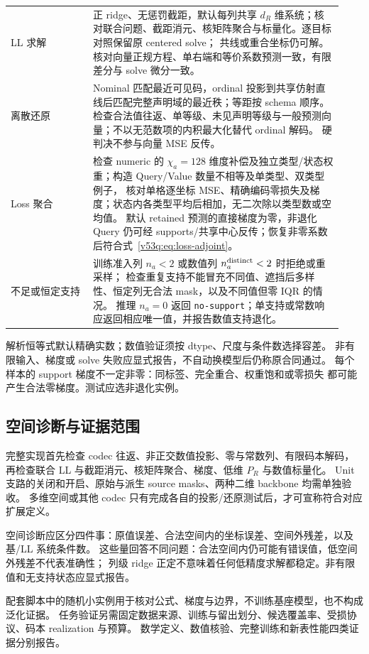 \documentclass[11pt,UTF8,fontset=fandol]{ctexart}
\numberwithin{equation}{section}
\theoremstyle{definition}
\begin{document}
\begin{longtable}{>{\raggedright\arraybackslash}p{0.23\linewidth}
                  >{\raggedright\arraybackslash}p{0.70\linewidth}}
LL 求解 & 正 ridge、无惩罚截距，默认每列共享 $d_R$ 维系统；核对联合问题、截距消元、核矩阵聚合与标量化。逐目标对照保留原 centered solve；
共线或重合坐标仍可解。核对向量正规方程、单右端和等价系数预测一致，有限差分与 solve 微分一致。\\
离散还原 & Nominal 匹配最近可见码，ordinal 投影到共享仿射直线后匹配完整声明域的最近秩；等距按 schema 顺序。
检查合法值往返、单等级、未见声明等级与一般预测向量；不以无范数项的内积最大化替代 ordinal 解码。
硬判决不参与向量 MSE 反传。\\
Loss 聚合 & 检查 numeric 的 $\chi_a=128$ 维度补偿及独立类型/状态权重；构造 Query/Value 数量不相等及单类型、双类型例子，
核对单格逐坐标 MSE、精确编码零损失及梯度；状态内各类型平均后相加，无二次除以类型数或空均值。
默认 retained 预测的直接梯度为零，非退化 Query 仍可经 supports/共享中心反传；恢复非零系数后符合式~\eqref{v53q:eq:loss-adjoint}。\\
不足或恒定支持 & 训练准入列 $n_a<2$ 或数值列 $n_a^{\rm distinct}<2$ 时拒绝或重采样；
检查重复支持不能冒充不同值、遮挡后多样性、恒定列无合法 mask，以及不同值但零 IQR 的情况。
推理 $n_a=0$ 返回 \texttt{no-support}；单支持或常数响应返回相应唯一值，并报告数值支持退化。\\
\bottomrule
\end{longtable}

解析恒等式默认精确实数；数值验证须按 dtype、尺度与条件数选择容差。
非有限输入、梯度或 solve 失败应显式报告，不自动换模型后仍称原合同通过。
每个样本的 support 梯度不一定非零：同标签、完全重合、权重饱和或零损失
都可能产生合法零梯度。测试应选非退化实例。

\subsection{空间诊断与证据范围}
\label{v51:sec:revision-audit}
完整实现首先检查 codec 往返、非正交数值投影、零与常数列、有限码本解码，
再检查联合 LL 与截距消元、核矩阵聚合、梯度、低维 $P_R$ 与数值标量化。
Unit 支路的关闭和开启、原始与派生 source masks、两种二维 backbone 均需单独验收。
多维空间或其他 codec 只有完成各自的投影/还原测试后，才可宣称符合对应扩展定义。

空间诊断应区分四件事：原值误差、合法空间内的坐标误差、空间外残差，以及基/LL 系统条件数。
这些量回答不同问题：合法空间内仍可能有错误值，低空间外残差不代表准确性；
列级 ridge 正定不意味着任何低精度求解都稳定。非有限值和无支持状态应显式报告。

配套脚本中的随机小实例用于核对公式、梯度与边界，不训练基座模型，也不构成泛化证据。
任务验证另需固定数据来源、训练与留出划分、候选覆盖率、受损协议、码本 realization 与预算。
数学定义、数值核验、完整训练和新表性能四类证据分别报告。
\end{document}
